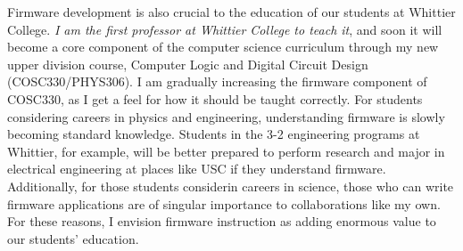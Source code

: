 \documentclass[../../main.tex]{subfiles}
\begin{document}
Firmware development is also crucial to the education of our students at Whittier College.  \textit{I am the first professor at Whittier College to teach it}, and soon it will become a core component of the computer science curriculum through my new upper division course, Computer Logic and Digital Circuit Design (COSC330/PHYS306).  I am gradually increasing the firmware component of COSC330, as I get a feel for how it should be taught correctly.  For students considering careers in physics and engineering, understanding firmware is slowly becoming standard knowledge.  Students in the 3-2 engineering programs at Whittier, for example, will be better prepared to perform research and major in electrical engineering at places like USC if they understand firmware.  Additionally, for those students considerin careers in science, those who can write firmware applications are of singular importance to collaborations like my own.  For these reasons, I envision firmware instruction as adding enormous value to our students' education.
\end{document}
